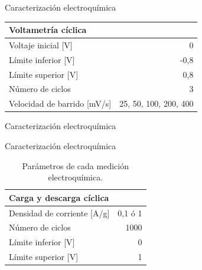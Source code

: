 \documentclass[aspectratio=169]{beamer}
\begin{document}
	\begin{frame}{Caracterización electroquímica}
		\begin{table}[h!]
			\centering
			\begin{tabular}{ l r }
				Voltametría cíclica &  \\
				\hline
				Voltaje inicial [V] & 0 \\
				Límite inferior [V] & -0,8 \\
				Límite superior [V] & 0,8  \\
				Número de ciclos & 3 \\
				Velocidad de barrido [mV/s] & 25, 50, 100, 200, 400
			\end{tabular}
		\end{table}
	\end{frame}

	\begin{frame}[fragile]{Caracterización electroquímica}
		\begin{figure}
		\end{figure}
	\end{frame}

	\begin{frame}{Caracterización electroquímica}
\begin{table}[h!]
	\centering
	\begin{tabular}{ l r }
		Carga y descarga cíclica & \\
		\hline
		Densidad de corriente [A/g] & 0,1 ó 	1 \\
		Número de ciclos & 1000 \\
		Límite inferior [V] & 0 \\
		Límite superior [V] & 1 \\
	\end{tabular}
	\label{tab:elec_config}
	\caption[Parámetros de cada medición electroquímica]{Parámetros de cada medición electroquímica.}
\end{table}
\end{frame}
\end{document}
